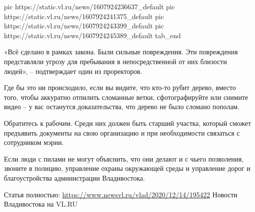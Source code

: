 	pic https://static.vl.ru/news/1607924236637_default
	pic https://static.vl.ru/news/1607924241375_default
	pic https://static.vl.ru/news/1607924243399_default
	pic https://static.vl.ru/news/1607924245389_default
tab_end
\fi

«Всё сделано в рамках закона. Были сильные повреждения. Эти повреждения
представляли угрозу для пребывания в непосредственной от них близости людей», –
подтверждает один из проректоров.

Где бы это ни происходило, если вы видите, что кто-то рубит дерево, вместо
того, чтобы аккуратно отпилить сломанные ветки, сфотографируйте или снимите
видео – у вас останутся доказательства, что дерево не было сломано пополам.

Обратитесь к рабочим. Среди них должен быть старший участка, который сможет
предъявить документы на свою организацию и при необходимости связаться с
сотрудником мэрии.

Если люди с пилами не могут объяснить, что они делают и с чьего позволения,
звоните в полицию, управление охраны окружающей среды и управление дорог и
благоустройства администрации Владивостока.

Статья полностью: \url{https://www.newsvl.ru/vlad/2020/12/14/195422}
Новости Владивостока на VL.RU


